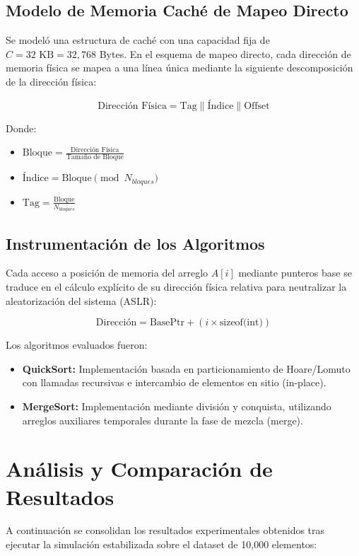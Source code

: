 \documentclass[12pt, a4paper]{article}
\begin{document}
\subsection{Modelo de Memoria Caché de Mapeo Directo}
Se modeló una estructura de caché con una capacidad fija de $C = 32\text{ KB} = 32,768$ Bytes. En el esquema de mapeo directo, cada dirección de memoria física se mapea a una línea única mediante la siguiente descomposición de la dirección física: 

$$ \text{Dirección Física} = \text{Tag} \parallel \text{Índice} \parallel \text{Offset} $$ %

Donde:
\begin{itemize}
\item $\text{Bloque} = \frac{\text{Dirección Física}}{\text{Tamaño de Bloque}}$ 
\item $\text{Índice} = \text{Bloque} \pmod{N_{bloques}}$ 
\item $\text{Tag} = \frac{\text{Bloque}}{N_{bloques}}$ 
\end{itemize}

\subsection{Instrumentación de los Algoritmos}
Cada acceso a posición de memoria del arreglo $A[i]$ mediante punteros base se traduce en el cálculo explícito de su dirección física relativa para neutralizar la aleatorización del sistema (ASLR): 

$$ \text{Dirección} = \text{BasePtr} + (i \times \text{sizeof(int)}) $$ 

Los algoritmos evaluados fueron:
\begin{itemize}
\item \textbf{QuickSort:} Implementación basada en particionamiento de Hoare/Lomuto con llamadas recursivas e intercambio de elementos en sitio (in-place). 
\item \textbf{MergeSort:} Implementación mediante división y conquista, utilizando arreglos auxiliares temporales durante la fase de mezcla (merge). 
\end{itemize}

\section{Análisis y Comparación de Resultados}
A continuación se consolidan los resultados experimentales obtenidos tras ejecutar la simulación estabilizada sobre el dataset de 10,000 elementos: 
\end{document}
